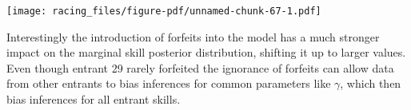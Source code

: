 \documentclass[
  letterpaper,
  DIV=11,
  numbers=noendperiod]{scrartcl}
\newenvironment{Shaded}{\begin{snugshade}}{\end{snugshade}}
\newcommand{\AttributeTok}[1]{\textcolor[rgb]{0.40,0.45,0.13}{#1}}
\newcommand{\ConstantTok}[1]{\textcolor[rgb]{0.56,0.35,0.01}{#1}}
\newcommand{\DecValTok}[1]{\textcolor[rgb]{0.68,0.00,0.00}{#1}}
\newcommand{\FloatTok}[1]{\textcolor[rgb]{0.68,0.00,0.00}{#1}}
\newcommand{\FunctionTok}[1]{\textcolor[rgb]{0.28,0.35,0.67}{#1}}
\newcommand{\NormalTok}[1]{\textcolor[rgb]{0.00,0.23,0.31}{#1}}
\newcommand{\SpecialCharTok}[1]{\textcolor[rgb]{0.37,0.37,0.37}{#1}}
\newcommand{\StringTok}[1]{\textcolor[rgb]{0.13,0.47,0.30}{#1}}
\begin{document}
\begin{Shaded}
\end{Shaded}

\texttt{[image: racing\_files/figure-pdf/unnamed-chunk-67-1.pdf]}

Interestingly the introduction of forfeits into the model has a much
stronger impact on the marginal skill posterior distribution, shifting
it up to larger values. Even though entrant 29 rarely forfeited the
ignorance of forfeits can allow data from other entrants to bias
inferences for common parameters like \(\gamma\), which then bias
inferences for all entrant skills.
\end{document}
